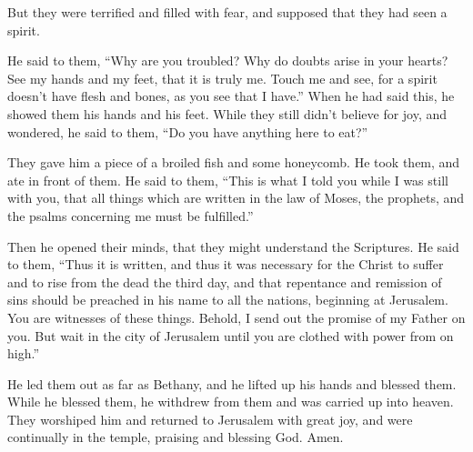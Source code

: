  But they were terrified and filled with fear, and supposed
that they had seen a spirit.

 He said to them, ``Why are you troubled? Why do doubts
arise in your hearts?  See my hands and my feet, that it is
truly me. Touch me and see, for a spirit doesn't have flesh and bones,
as you see that I have.''  When he had said this, he showed
them his hands and his feet.  While they still didn't
believe for joy, and wondered, he said to them, ``Do you have anything
here to eat?''

 They gave him a piece of a broiled fish and some
honeycomb.  He took them, and ate in front of them.
 He said to them, ``This is what I told you while I was
still with you, that all things which are written in the law of Moses,
the prophets, and the psalms concerning me must be fulfilled.''

 Then he opened their minds, that they might understand the
Scriptures.  He said to them, ``Thus it is written, and
thus it was necessary for the Christ to suffer and to rise from the dead
the third day,  and that repentance and remission of sins
should be preached in his name to all the nations, beginning at
Jerusalem.  You are witnesses of these things.
 Behold, I send out the promise of my Father on you. But
wait in the city of Jerusalem until you are clothed with power from on
high.''

 He led them out as far as Bethany, and he lifted up his
hands and blessed them.  While he blessed them, he withdrew
from them and was carried up into heaven.  They worshiped
him and returned to Jerusalem with great joy,  and were
continually in the temple, praising and blessing God. Amen.
